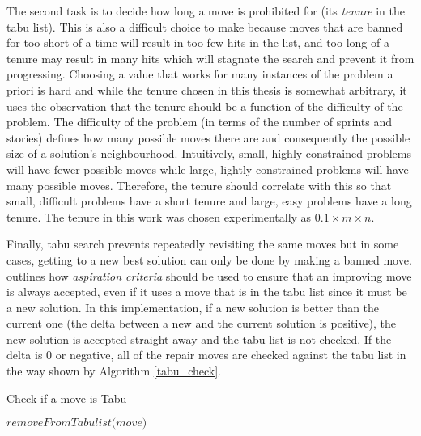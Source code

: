 The second task is to decide how long a move is prohibited for (its \textit{tenure} in the tabu list). This is also a difficult choice to make because moves that are banned for too short of a time will result in too few hits in the list, and too long of a tenure may result in many hits which will stagnate the search and prevent it from progressing. Choosing a value that works for many instances of the problem a priori is hard and while the tenure chosen in this thesis is somewhat arbitrary, it uses the observation that the tenure should be a function of the difficulty of the problem. The difficulty of the problem (in terms of the number of sprints and stories) defines how many possible moves there are and consequently the possible size of a solution's neighbourhood. Intuitively, small, highly-constrained problems will have fewer possible moves while large, lightly-constrained problems will have many possible moves. Therefore, the tenure should correlate with this so that small, difficult problems have a short tenure and large, easy problems have a long tenure. The tenure in this work was chosen experimentally as $0.1 \times m \times n$.

Finally, tabu search prevents repeatedly revisiting the same moves but in some cases, getting to a new best solution can only be done by making a banned move. \citet{glover1989tabu} outlines how \textit{aspiration criteria} should be used to ensure that an improving move is always accepted, even if it uses a move that is in the tabu list since it must be a new solution. In this implementation, if a new solution is better than the current one (the delta between a new and the current solution is positive), the new solution is accepted straight away and the tabu list is not checked. If the delta is 0 or negative, all of the repair moves are checked against the tabu list in the way shown by Algorithm \ref{tabu_check}.

\begin{algorithm}[H]
\caption{Check if a move is Tabu}\label{tabu_check}
\begin{algorithmic}[1]
                \State $\textit{removeFromTabulist(move)}$
                \State {}
            \Else{}
                \State {}
            \EndIf
        \Else{}
            \State {}
        \EndIf
    \EndProcedure
\end{algorithmic}
\end{algorithm}